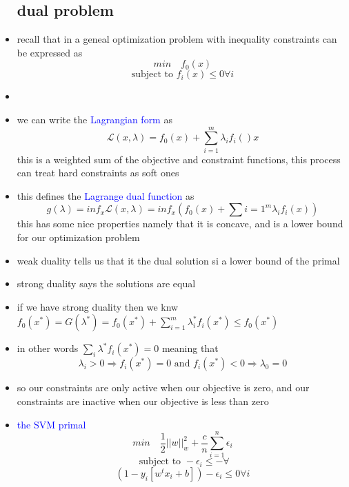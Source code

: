 \documentclass{article}
\begin{document}
\begin{itemize}
\subsection*{dual problem}
\item recall that in a geneal optimization problem with inequality constraints can be expressed as $$min \quad f_{0}(x)$$ $$\text{subject to } f_i(x)\leq 0 \forall i $$
\item 
\item we can write the \textcolor{blue}{Lagrangian form  } as $$\mathcal{L}(x,\lambda )= f_{0}(x)+\sum_{i=1}^{m}\lambda_{i}f_i()x$$ this is a weighted sum of the objective and constraint functions, this process can treat hard constraints as soft ones 
\item this defines the \textcolor{blue}{Lagrange dual function} as $$g(\lambda )= inf_{x}\mathcal{L}(x,\lambda )= inf_{x}(f_{0}(x)+\sum{i=1}^{m}\lambda_if_i(x))$$
this has some nice properties namely that it is concave, and is a lower bound for our optimization problem 
\item weak duality tells us that it the dual solution si a lower bound of the primal 
\item strong duality says the solutions are equal
\item if we have strong duality then we knw $f_{0}(x^{*})=G(\lambda^{*})=f_{0}(x^{*})+\sum_{i=1}^{m}\lambda_{i}^{*}f_{i}(x^{*})\leq  f_{0}(x^{*})$
\item in other words $\sum_{i}\lambda^{*}f_{i}(x^{*})=0$ meaning that $$\lambda_{i}>0 \Rightarrow f_{i}(x^{*})=0 \text{ and }f_i(x^{*})<0\Rightarrow \lambda_0=0$$
\item so our constraints are only active when our objective is zero, and our constraints are inactive when our objective is less than zero 
\item \textcolor{blue}{the SVM primal } $$min\quad \frac{1}{2}||w||^{2}_{w}+\frac{c}{n}\sum_{i=1}^{n}\epsilon_{i}$$ $$\text{ subject to }-\epsilon_{i}\leq - \forall $$ $$(1-y_i[w^tx_i+b])-\epsilon_{i}\leq 0 \forall i$$


\end{itemize}
\end{document}
